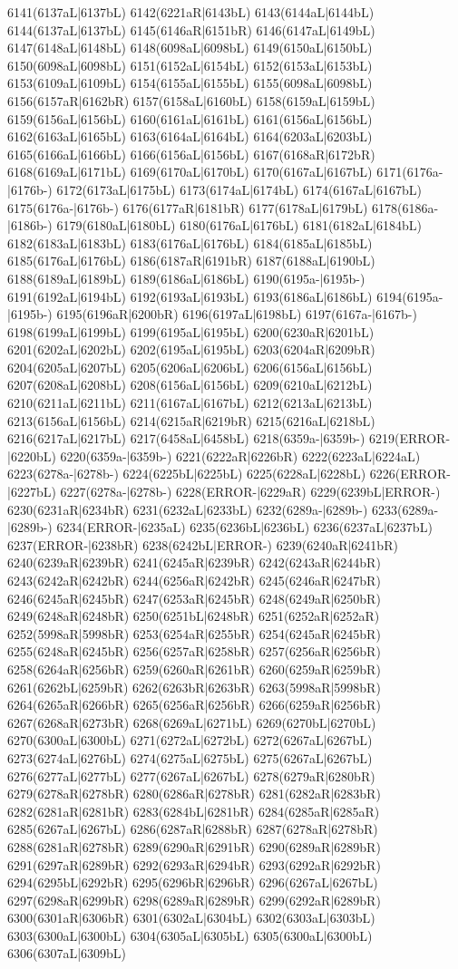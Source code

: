 6141(6137aL|6137bL) 6142(6221aR|6143bL) 6143(6144aL|6144bL) 6144(6137aL|6137bL) 6145(6146aR|6151bR) 6146(6147aL|6149bL) 6147(6148aL|6148bL) 6148(6098aL|6098bL) 6149(6150aL|6150bL) 6150(6098aL|6098bL) 6151(6152aL|6154bL) 6152(6153aL|6153bL) 6153(6109aL|6109bL) 6154(6155aL|6155bL) 6155(6098aL|6098bL) 6156(6157aR|6162bR) 6157(6158aL|6160bL) 6158(6159aL|6159bL) 6159(6156aL|6156bL) 6160(6161aL|6161bL) 6161(6156aL|6156bL) 6162(6163aL|6165bL) 6163(6164aL|6164bL) 6164(6203aL|6203bL) 6165(6166aL|6166bL) 6166(6156aL|6156bL) 6167(6168aR|6172bR) 6168(6169aL|6171bL) 6169(6170aL|6170bL) 6170(6167aL|6167bL) 6171(6176a-|6176b-) 6172(6173aL|6175bL) 6173(6174aL|6174bL) 6174(6167aL|6167bL) 6175(6176a-|6176b-) 6176(6177aR|6181bR) 6177(6178aL|6179bL) 6178(6186a-|6186b-) 6179(6180aL|6180bL) 6180(6176aL|6176bL) 6181(6182aL|6184bL) 6182(6183aL|6183bL) 6183(6176aL|6176bL) 6184(6185aL|6185bL) 6185(6176aL|6176bL) 6186(6187aR|6191bR) 6187(6188aL|6190bL) 6188(6189aL|6189bL) 6189(6186aL|6186bL) 6190(6195a-|6195b-) 6191(6192aL|6194bL) 6192(6193aL|6193bL) 6193(6186aL|6186bL) 6194(6195a-|6195b-) 6195(6196aR|6200bR) 6196(6197aL|6198bL) 6197(6167a-|6167b-) 6198(6199aL|6199bL) 6199(6195aL|6195bL) 6200(6230aR|6201bL) 6201(6202aL|6202bL) 6202(6195aL|6195bL) 6203(6204aR|6209bR) 6204(6205aL|6207bL) 6205(6206aL|6206bL) 6206(6156aL|6156bL) 6207(6208aL|6208bL) 6208(6156aL|6156bL) 6209(6210aL|6212bL) 6210(6211aL|6211bL) 6211(6167aL|6167bL) 6212(6213aL|6213bL) 6213(6156aL|6156bL) 6214(6215aR|6219bR) 6215(6216aL|6218bL) 6216(6217aL|6217bL) 6217(6458aL|6458bL) 6218(6359a-|6359b-) 6219(ERROR-|6220bL) 6220(6359a-|6359b-) 6221(6222aR|6226bR) 6222(6223aL|6224aL) 6223(6278a-|6278b-) 6224(6225bL|6225bL) 6225(6228aL|6228bL) 6226(ERROR-|6227bL) 6227(6278a-|6278b-) 6228(ERROR-|6229aR) 6229(6239bL|ERROR-) 6230(6231aR|6234bR) 6231(6232aL|6233bL) 6232(6289a-|6289b-) 6233(6289a-|6289b-) 6234(ERROR-|6235aL) 6235(6236bL|6236bL) 6236(6237aL|6237bL) 6237(ERROR-|6238bR) 6238(6242bL|ERROR-) 6239(6240aR|6241bR) 6240(6239aR|6239bR) 6241(6245aR|6239bR) 6242(6243aR|6244bR) 6243(6242aR|6242bR) 6244(6256aR|6242bR) 6245(6246aR|6247bR) 6246(6245aR|6245bR) 6247(6253aR|6245bR) 6248(6249aR|6250bR) 6249(6248aR|6248bR) 6250(6251bL|6248bR) 6251(6252aR|6252aR) 6252(5998aR|5998bR) 6253(6254aR|6255bR) 6254(6245aR|6245bR) 6255(6248aR|6245bR) 6256(6257aR|6258bR) 6257(6256aR|6256bR) 6258(6264aR|6256bR) 6259(6260aR|6261bR) 6260(6259aR|6259bR) 6261(6262bL|6259bR) 6262(6263bR|6263bR) 6263(5998aR|5998bR) 6264(6265aR|6266bR) 6265(6256aR|6256bR) 6266(6259aR|6256bR) 6267(6268aR|6273bR) 6268(6269aL|6271bL) 6269(6270bL|6270bL) 6270(6300aL|6300bL) 6271(6272aL|6272bL) 6272(6267aL|6267bL) 6273(6274aL|6276bL) 6274(6275aL|6275bL) 6275(6267aL|6267bL) 6276(6277aL|6277bL) 6277(6267aL|6267bL) 6278(6279aR|6280bR) 6279(6278aR|6278bR) 6280(6286aR|6278bR) 6281(6282aR|6283bR) 6282(6281aR|6281bR) 6283(6284bL|6281bR) 6284(6285aR|6285aR) 6285(6267aL|6267bL) 6286(6287aR|6288bR) 6287(6278aR|6278bR) 6288(6281aR|6278bR) 6289(6290aR|6291bR) 6290(6289aR|6289bR) 6291(6297aR|6289bR) 6292(6293aR|6294bR) 6293(6292aR|6292bR) 6294(6295bL|6292bR) 6295(6296bR|6296bR) 6296(6267aL|6267bL) 6297(6298aR|6299bR) 6298(6289aR|6289bR) 6299(6292aR|6289bR) 6300(6301aR|6306bR) 6301(6302aL|6304bL) 6302(6303aL|6303bL) 6303(6300aL|6300bL) 6304(6305aL|6305bL) 6305(6300aL|6300bL) 6306(6307aL|6309bL) 
